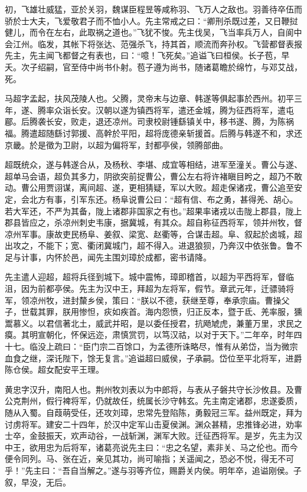 \documentclass[12pt,UTF8]{ctexbook}
\begin{document}
初，飞雄壮威猛，亚於关羽，魏谋臣程昱等咸称羽、飞万人之敌也。羽善待卒伍而骄於士大夫，飞爱敬君子而不恤小人。先主常戒之曰：“卿刑杀既过差，又日鞭挝健儿，而令在左右，此取祸之道也。”飞犹不悛。先主伐吴，飞当率兵万人，自阆中会江州。临发，其帐下将张达、范强杀飞，持其首，顺流而奔孙权。飞营都督表报先主，先主闻飞都督之有表也，曰：“噫！飞死矣。”追谥飞曰桓侯。长子苞，早夭。次子绍嗣，官至侍中尚书仆射。苞子遵为尚书，随诸葛瞻於绵竹，与邓艾战，死。

马超字孟起，扶风茂陵人也。父腾，灵帝末与边章、韩遂等俱起事於西州。初平三年，遂、腾率众诣长安。汉朝以遂为镇西将军，遣还金城，腾为征西将军，遣屯郿。后腾袭长安，败走，退还凉州。司隶校尉锺繇镇关中，移书遂、腾，为陈祸福。腾遣超随繇讨郭援、高幹於平阳，超将庞德亲斩援首。后腾与韩遂不和，求还京畿。於是徵为卫尉，以超为偏将军，封都亭侯，领腾部曲。

超既统众，遂与韩遂合从，及杨秋、李堪、成宜等相结，进军至潼关。曹公与遂、超单马会语，超负其多力，阴欲突前捉曹公，曹公左右将许褚瞋目盻之，超乃不敢动。曹公用贾诩谋，离间超、遂，更相猜疑，军以大败。超走保诸戎，曹公追至安定，会北方有事，引军东还。杨阜说曹公曰：“超有信、布之勇，甚得羌、胡心。若大军还，不严为其备，陇上诸郡非国家之有也。”超果率诸戎以击陇上郡县，陇上郡县皆应之，杀凉州刺史韦康，据冀城，有其众。超自称征西将军，领并州牧，督凉州军事。康故吏民杨阜、姜叙、梁宽、赵衢等，合谋击超。阜、叙起於卤城，超出攻之，不能下；宽、衢闭冀城门，超不得入。进退狼狈，乃奔汉中依张鲁。鲁不足与计事，内怀於邑，闻先主围刘璋於成都，密书请降。

先主遣人迎超，超将兵径到城下。城中震怖，璋即稽首，以超为平西将军，督临沮，因为前都亭侯。先主为汉中王，拜超为左将军，假节。章武元年，迁骠骑将军，领凉州牧，进封斄乡侯，策曰：“朕以不德，获继至尊，奉承宗庙。曹操父子，世载其罪，朕用惨怛，疢如疾首。海内怨愤，归正反本，暨于氐、羌率服，獯鬻慕义。以君信著北土，威武并昭，是以委任授君，抗飏虓虎，兼董万里，求民之瘼。其明宣朝化，怀保远迩，肃慎赏罚，以笃汉祜，以对于天下。”二年卒，时年四十七。临没上疏曰：“臣门宗二百馀口，为孟德所诛略尽，惟有从弟岱，当为微宗血食之继，深讬陛下，馀无复言。”追谥超曰威侯，子承嗣。岱位至平北将军，进爵陈仓侯。超女配安平王理。

黄忠字汉升，南阳人也。荆州牧刘表以为中郎将，与表从子磐共守长沙攸县。及曹公克荆州，假行裨将军，仍就故任，统属长沙守韩玄。先主南定诸郡，忠遂委质，随从入蜀。自葭萌受任，还攻刘璋，忠常先登陷陈，勇毅冠三军。益州既定，拜为讨虏将军。建安二十四年，於汉中定军山击夏侯渊。渊众甚精，忠推锋必进，劝率士卒，金鼓振天，欢声动谷，一战斩渊，渊军大败。迁征西将军。是岁，先主为汉中王，欲用忠为后将军，诸葛亮说先主曰：“忠之名望，素非关、马之伦也。而今便令同列。马、张在近，亲见其功，尚可喻指；关遥闻之，恐必不悦，得无不可乎！”先主曰：“吾自当解之。”遂与羽等齐位，赐爵关内侯。明年卒，追谥刚侯。子叙，早没，无后。
\end{document}
